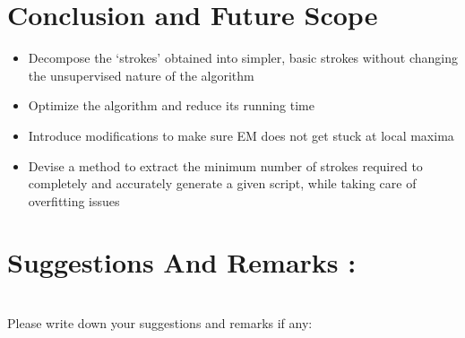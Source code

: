 \documentclass[10pt]{article}
\begin{document}
	\section{Conclusion and Future Scope}
		\hrulefill
		\begin{itemize}
			\item 
			Decompose the ‘strokes’ obtained into simpler, basic strokes without changing the unsupervised nature of the algorithm
			\item
			Optimize the algorithm and reduce its running time
			\item
			Introduce modifications to make sure EM does not get stuck at local maxima
			\item
			Devise a method to extract the minimum number of strokes required to completely and accurately generate a given script, while taking care of overfitting issues
		\end{itemize}
	\newpage
	\printbibliography
	\newpage
	\section{Suggestions And Remarks :}
		\hrulefill\\
		\Large Please write down your suggestions and remarks if any:	
\end{document}

